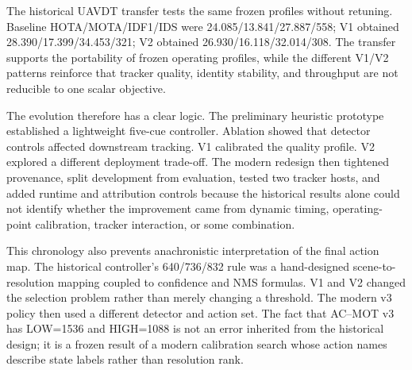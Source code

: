 The historical UAVDT transfer tests the same frozen profiles without retuning. Baseline HOTA/MOTA/IDF1/IDS were 24.085/13.841/27.887/558; V1 obtained 28.390/17.399/34.453/321; V2 obtained 26.930/16.118/32.014/308. The transfer supports the portability of frozen operating profiles, while the different V1/V2 patterns reinforce that tracker quality, identity stability, and throughput are not reducible to one scalar objective.

The evolution therefore has a clear logic. The preliminary heuristic prototype established a lightweight five-cue controller. Ablation showed that detector controls affected downstream tracking. V1 calibrated the quality profile. V2 explored a different deployment trade-off. The modern redesign then tightened provenance, split development from evaluation, tested two tracker hosts, and added runtime and attribution controls because the historical results alone could not identify whether the improvement came from dynamic timing, operating-point calibration, tracker interaction, or some combination.

This chronology also prevents anachronistic interpretation of the final action map. The historical controller's 640/736/832 rule was a hand-designed scene-to-resolution mapping coupled to confidence and NMS formulas. V1 and V2 changed the selection problem rather than merely changing a threshold. The modern v3 policy then used a different detector and action set. The fact that AC--MOT v3 has LOW=1536 and HIGH=1088 is not an error inherited from the historical design; it is a frozen result of a modern calibration search whose action names describe state labels rather than resolution rank.

